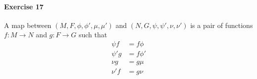 \documentclass{report}
\begin{document}
    \paragraph{Exercise 17}
    A map between $(M, F, \phi, \phi', \mu, \mu')$ and $(N, G, \psi, \psi', \nu, \nu')$
    is a pair of functions $f : M \rightarrow N$ and $g : F \rightarrow G$ such that
    \begin{align*}
        \psi f & = f \phi \\
        \psi' g & = f \phi' \\
        \nu g & = g \mu \\
        \nu' f & = g \nu
    \end{align*}
\end{document}
